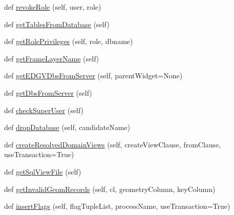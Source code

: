 \begin{DoxyCompactItemize}
\item 
def \mbox{\hyperlink{class_dsg_tools_1_1_factories_1_1_db_factory_1_1postgis_db_1_1_postgis_db_a2ad59cb20111f3290e69a630da3d5676}{revoke\+Role}} (self, user, role)
\item 
def \mbox{\hyperlink{class_dsg_tools_1_1_factories_1_1_db_factory_1_1postgis_db_1_1_postgis_db_a39cf35c860d0470af3aba54955dd0c19}{get\+Tables\+From\+Database}} (self)
\item 
def \mbox{\hyperlink{class_dsg_tools_1_1_factories_1_1_db_factory_1_1postgis_db_1_1_postgis_db_ab038bb83ac22cc36e91780ad3b5f447d}{get\+Role\+Privileges}} (self, role, dbname)
\item 
def \mbox{\hyperlink{class_dsg_tools_1_1_factories_1_1_db_factory_1_1postgis_db_1_1_postgis_db_a858d9eaa0933ea0a90d8afba6fd578d7}{get\+Frame\+Layer\+Name}} (self)
\item 
def \mbox{\hyperlink{class_dsg_tools_1_1_factories_1_1_db_factory_1_1postgis_db_1_1_postgis_db_a7136ab08673e14998876dd8f41f7694c}{get\+E\+D\+G\+V\+Dbs\+From\+Server}} (self, parent\+Widget=None)
\item 
def \mbox{\hyperlink{class_dsg_tools_1_1_factories_1_1_db_factory_1_1postgis_db_1_1_postgis_db_a0cbf4eb6f5c3e387469e5ee8113b1319}{get\+Dbs\+From\+Server}} (self)
\item 
def \mbox{\hyperlink{class_dsg_tools_1_1_factories_1_1_db_factory_1_1postgis_db_1_1_postgis_db_ad207ce5d993c5c3b3d1cc8dcc1403f7d}{check\+Super\+User}} (self)
\item 
def \mbox{\hyperlink{class_dsg_tools_1_1_factories_1_1_db_factory_1_1postgis_db_1_1_postgis_db_a806f1af3bf1bfc9c7fa5c4e322e0ef30}{drop\+Database}} (self, candidate\+Name)
\item 
def \mbox{\hyperlink{class_dsg_tools_1_1_factories_1_1_db_factory_1_1postgis_db_1_1_postgis_db_a7bd306d8b623d73e99e15206c8d64a48}{create\+Resolved\+Domain\+Views}} (self, create\+View\+Clause, from\+Clause, use\+Transaction=True)
\item 
def \mbox{\hyperlink{class_dsg_tools_1_1_factories_1_1_db_factory_1_1postgis_db_1_1_postgis_db_a2712a02bf8c2cb9bef4245b7be7ba6bd}{get\+Sql\+View\+File}} (self)
\item 
def \mbox{\hyperlink{class_dsg_tools_1_1_factories_1_1_db_factory_1_1postgis_db_1_1_postgis_db_af5a32689ca7097b712de34e08408c323}{get\+Invalid\+Geom\+Records}} (self, cl, geometry\+Column, key\+Column)
\item 
def \mbox{\hyperlink{class_dsg_tools_1_1_factories_1_1_db_factory_1_1postgis_db_1_1_postgis_db_acaefaf8ad3940bba3d485564aed4846c}{insert\+Flags}} (self, flag\+Tuple\+List, process\+Name, use\+Transaction=True)

\end{DoxyCompactItemize}
